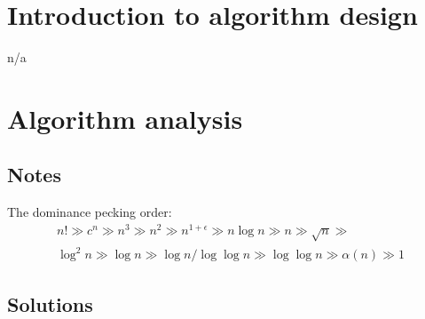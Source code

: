 \documentclass{report}
\begin{document}
\chapter{Introduction to algorithm design}

n/a

\chapter{Algorithm analysis}

\section*{Notes}
The dominance pecking order:
\begin{gather*}
	n! \gg c^n \gg n^3 \gg n^2 \gg n^{1+\epsilon} \gg n\log n \gg n \gg \sqrt{n} \gg \\
	\log^2 n \gg \log n \gg \log n/\log\log n \gg \log\log n \gg \alpha(n) \gg 1
\end{gather*}

\section*{Solutions}
\end{document}
